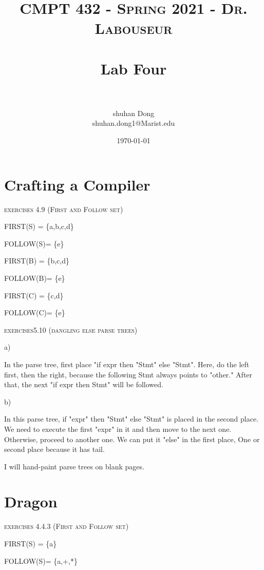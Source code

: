 \documentclass[letterpaper, 10pt,DIV=13]{scrartcl}
\title{	
   \normalfont \normalsize 
   \textsc{CMPT 432 - Spring 2021 - Dr. Labouseur} \\[10pt] %
   \horrule{0.5pt} \\[0.25cm] 	%
   \huge Lab Four \\     	    %
   \horrule{0.5pt} \\[0.25cm] 	%
}
\author{shuhan Dong \\ \normalsize  shuhan.dong1@Marist.edu}
\date{\normalsize\today} 	%
\numberwithin{equation}{section} %
\numberwithin{figure}{section} %
\numberwithin{table}{section} %
\begin{document}
\maketitle %

\section{Crafting a Compiler}
\textsc{exercises	4.9	(First and Follow set)			}

FIRST(S) = \{a,b,c,d\}

FOLLOW(S)= \{e\}

FIRST(B) = \{b,c,d\}

FOLLOW(B)= \{e\}

FIRST(C) = \{c,d\}

FOLLOW(C)= \{e\}





\textsc{exercises5.10 (dangling else parse trees)			}






a)

In the parse tree, first place "if expr then "Stmt" else "Stmt". Here, do the left first, then the right, because the following Stmt always points to "other." After that, the next "if expr then Stmt" will be followed.



b)

In this parse tree, if "expr" then "Stmt" else "Stmt" is placed in the second place. We need to execute the first "expr" in it and then move to the next one. Otherwise, proceed to another one. We can put it "else" in the first place, One or second place because it has tail.




I will hand-paint parse trees on blank pages.














\section{Dragon}

\textsc{ exercises 4.4.3 (First and Follow set)}


FIRST(S) = \{a\}

FOLLOW(S)= \{a,+,*\}
\end{document}

